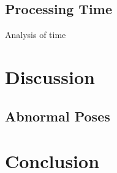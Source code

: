 \documentclass[11pt]{article} %
\begin{document}
\begin{figure}
\qquad%
\caption{}
\label{fig:lrlOverMeasure}
\end{figure}


\subsection{Processing Time}

Analysis of time 




\section{Discussion}



\subsection{Abnormal Poses}
\label{sec:abnormals}


\section{Conclusion}







%
\end{document}
